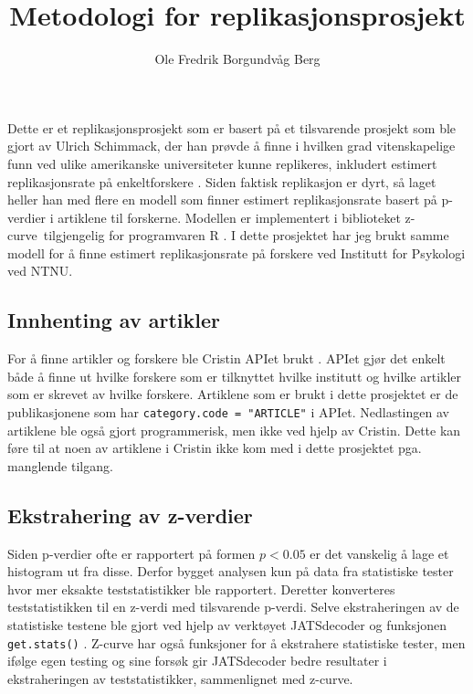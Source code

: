 \documentclass[doc,norsk]{apa7}
\title{Metodologi for replikasjonsprosjekt}
\author{Ole Fredrik Borgundvåg Berg}
\affiliation{NTNU}
\begin{document}
\maketitle

Dette er et replikasjonsprosjekt som er basert på et tilsvarende prosjekt som ble gjort av Ulrich Schimmack, der han prøvde å finne i hvilken grad vitenskapelige funn ved ulike amerikanske universiteter kunne replikeres, inkludert estimert replikasjonsrate på enkeltforskere \parencite{amerikansk-ranking}. Siden faktisk replikasjon er dyrt, så laget heller han med flere en modell som finner estimert replikasjonsrate basert på p-verdier i artiklene til forskerne. Modellen er implementert i biblioteket \guillemetleft z-curve\guillemetright\ tilgjengelig for programvaren R \parencite{z-curve-modell, z-curve-implementasjon}. I dette prosjektet har jeg brukt samme modell for å finne estimert replikasjonsrate på forskere ved Institutt for Psykologi ved NTNU.

\subsection{Innhenting av artikler}
For å finne artikler og forskere ble Cristin APIet brukt \parencite{cristin-api}. APIet gjør det enkelt både å finne ut hvilke forskere som er tilknyttet hvilke institutt og hvilke artikler som er skrevet av hvilke forskere. Artiklene som er brukt i dette prosjektet er de publikasjonene som har \texttt{category.code = "ARTICLE"} i APIet. Nedlastingen av artiklene ble også gjort programmerisk, men ikke ved hjelp av Cristin. Dette kan føre til at noen av artiklene i Cristin ikke kom med i dette prosjektet pga. manglende tilgang.

\subsection{Ekstrahering av z-verdier}
Siden p-verdier ofte er rapportert på formen $p < 0.05$ er det vanskelig å lage et histogram ut fra disse. Derfor bygget analysen kun på data fra statistiske tester hvor mer eksakte teststatistikker ble rapportert. Deretter konverteres teststatistikken til en z-verdi med tilsvarende p-verdi. Selve ekstraheringen av de statistiske testene ble gjort ved hjelp av verktøyet JATSdecoder og funksjonen \texttt{get.stats()} \parencite{jatsdecoder}. Z-curve har også funksjoner for å ekstrahere statistiske tester, men ifølge egen testing og \textcite{jatsdecoder} sine forsøk gir JATSdecoder bedre resultater i ekstraheringen av teststatistikker, sammenlignet med z-curve.
\end{document}
